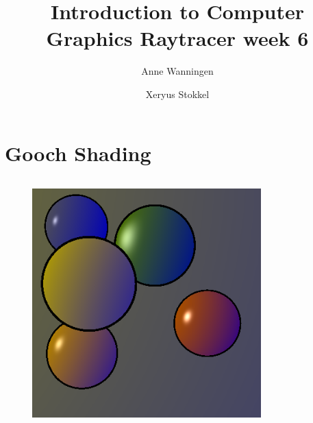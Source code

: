 \documentclass{beamer}
\author{Anne Wanningen \and Xeryus Stokkel}
\title[Week 6]{Introduction to Computer Graphics Raytracer week 6}
\begin{document}
\maketitle

\section{Gooch Shading}

\begin{frame}
	\begin{columns}[T]
		\begin{column}{.3\textwidth}
			\begin{figure}
				\includegraphics[width=\textwidth]{ref.png}
			\end{figure}
		\end{column}
		\begin{column}{.3\textwidth}
			\begin{figure}

\end{figure}
\end{column}
\end{columns}
\end{frame}
\end{document}
